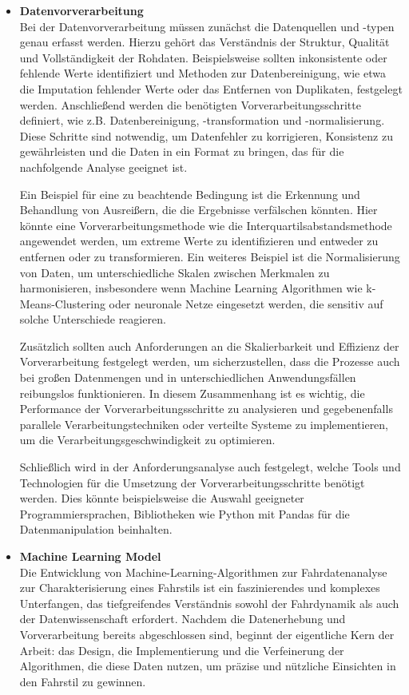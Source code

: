 \documentclass[oneside]{ausarbeitung}
\begin{document}
\begin{itemize}
  \item \textbf{Datenvorverarbeitung}\\ Bei der Datenvorverarbeitung müssen zunächst die Datenquellen und -typen genau erfasst werden. 
  Hierzu gehört das Verständnis der Struktur, Qualität und Vollständigkeit der Rohdaten. Beispielsweise sollten inkonsistente oder fehlende 
  Werte identifiziert und Methoden zur Datenbereinigung, wie etwa die Imputation fehlender Werte oder das Entfernen von Duplikaten, 
  festgelegt werden. Anschließend werden die benötigten Vorverarbeitungsschritte definiert, wie z.B. Datenbereinigung, -transformation 
  und -normalisierung. Diese Schritte sind notwendig, um Datenfehler zu korrigieren, Konsistenz zu gewährleisten und die Daten in ein 
  Format zu bringen, das für die nachfolgende Analyse geeignet ist.
  
  Ein Beispiel für eine zu beachtende Bedingung ist die Erkennung und Behandlung von Ausreißern, die die Ergebnisse verfälschen könnten. 
  Hier könnte eine Vorverarbeitungsmethode wie die Interquartilsabstandsmethode angewendet werden, um extreme Werte zu identifizieren und 
  entweder zu entfernen oder zu transformieren. Ein weiteres Beispiel ist die Normalisierung von Daten, um unterschiedliche Skalen zwischen 
  Merkmalen zu harmonisieren, insbesondere wenn Machine Learning Algorithmen wie k-Means-Clustering oder neuronale Netze eingesetzt werden, 
  die sensitiv auf solche Unterschiede reagieren.
  
  Zusätzlich sollten auch Anforderungen an die Skalierbarkeit und Effizienz der Vorverarbeitung festgelegt werden, um sicherzustellen, 
  dass die Prozesse auch bei großen Datenmengen und in unterschiedlichen Anwendungsfällen reibungslos funktionieren. In diesem Zusammenhang 
  ist es wichtig, die Performance der Vorverarbeitungsschritte zu analysieren und gegebenenfalls parallele Verarbeitungstechniken oder 
  verteilte Systeme zu implementieren, um die Verarbeitungsgeschwindigkeit zu optimieren.
  
  Schließlich wird in der Anforderungsanalyse auch festgelegt, welche Tools und Technologien für die Umsetzung der Vorverarbeitungsschritte 
  benötigt werden. Dies könnte beispielsweise die Auswahl geeigneter Programmiersprachen, Bibliotheken wie Python mit Pandas für die 
  Datenmanipulation beinhalten.
  
  \item \textbf{Machine Learning Model}\\ Die Entwicklung von Machine-Learning-Algorithmen zur Fahrdatenanalyse zur Charakterisierung 
  eines Fahrstils ist ein faszinierendes und komplexes Unterfangen, das tiefgreifendes Verständnis sowohl der Fahrdynamik als auch der 
  Datenwissenschaft erfordert. Nachdem die Datenerhebung und Vorverarbeitung bereits abgeschlossen sind, beginnt der eigentliche Kern 
  der Arbeit: das Design, die Implementierung und die Verfeinerung der Algorithmen, die diese Daten nutzen, um präzise und nützliche 
  Einsichten in den Fahrstil zu gewinnen.
  

\end{itemize}
\end{document}
